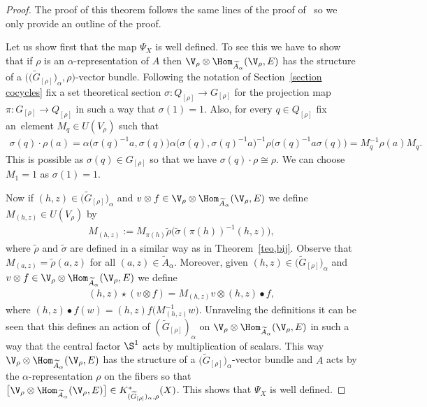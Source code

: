 \begin{proof}
The proof of this theorem follows the same lines of the proof of~\cite[Theorem 3.1]{GomezUribe}
so we only provide an outline of the proof.

Let us show first that the map $\Psi_{X}$ is well defined. To see this we have to
show that if $\rho$ is an $\alpha$-representation of $A$ then
$\V_{\rho}\otimes\Hom_{\widetilde{A}_{\alpha}}(\V_{\rho},E)$
has the structure of a $\big(\big(\widetilde{G}_{[\rho]}\big)_{\alpha},\rho\big)$-vector bundle.
Following the notation of Section~\ref{section cocycles} fix a set theoretical
section $\sigma\colon Q_{[\rho]}\to G_{[\rho]}$ for the projection map $\pi\colon G_{[\rho]}\to Q_{[\rho]}$
in such a way that $\sigma(1)=1$. Also, for every $q\in Q_{[\rho]}$ fix an~element
$M_{q}\in U(V_{\rho})$ such that
\begin{gather*}
\sigma(q)\cdot \rho(a) =\alpha\big(\sigma(q)^{-1}a,\sigma(q)\big)\alpha\big(\sigma(q),\sigma(q)^{-1}a\big)^{-1}
\rho\big(\sigma(q)^{-1}a\sigma(q)\big)=M_{q}^{-1}\rho(a)M_{q}.
\end{gather*}
This is possible as $\sigma(q)\in G_{[\rho]}$ so that we have $\sigma(q)\cdot \rho\cong \rho$.
We can choose $M_{1}=1$ as $\sigma(1)=1$.

Now if $(h,z)\in \big(\widetilde{G}_{[\rho]}\big)_{\alpha}$ and $v\otimes f\in
\V_{\rho}\otimes \Hom_{\widetilde{A}_{\alpha}}(\V_{\rho},E)$
we define $M_{(h,z)}\in U(V_{\rho})$ by
\begin{gather*}
M_{(h,z)}:=M_{\pi(h)}\tilde{\rho}\big(\tilde{\sigma}(\pi(h))^{-1}(h,z)\big),
\end{gather*}
where $\tilde{\rho}$ and $\tilde{\sigma}$ are defined in a similar way as in
Theorem~\ref{teo,bij}. Observe that $M_{(a,z)}=\tilde{\rho}(a,z)$ for all
$(a,z)\in \widetilde{A}_{\alpha}$. Moreover, given $(h,z)\in \big(\widetilde{G}_{[\rho]}\big)_{\alpha}$
and $v\otimes f\in \V_{\rho}\otimes \Hom_{\widetilde{A}_{\alpha}}(\V_{\rho},E)$
we define
\begin{gather*}
(h,z)\star(v\otimes f)=M_{(h,z)}v\otimes (h,z)\bullet f,
\end{gather*}
where $(h,z)\bullet f (w)=(h,z)f\big(M_{(h,z)}^{-1}w\big)$. Unraveling the definitions it
can be seen that this defines an action of
$(\widetilde{G}_{[\rho]})_{\alpha}$ on $\V_{\rho}\otimes \Hom_{\widetilde{A}_{\alpha}}(\V_{\rho},E)$
in such a way that the central factor $\S^{1}$ acts by multiplication of scalars.
This way $\V_{\rho}\otimes \Hom_{\widetilde{A}_{\alpha}}(\V_{\rho},E)$ has the structure
of a $\big(\widetilde{G}_{[\rho]}\big)_{\alpha}$-vector bundle and $A$ acts by the
$\alpha$-representation $\rho$ on the fibers so that
$\big[\V_{\rho}\otimes \Hom_{\widetilde{A}_{\alpha}}(\V_{\rho},E)\big]\in
K^{\ast}_{(\widetilde{G}_{[\rho]})_{\alpha},\rho}(X)$. This shows that
$\Psi_{X}$ is well defined.



\end{proof}
